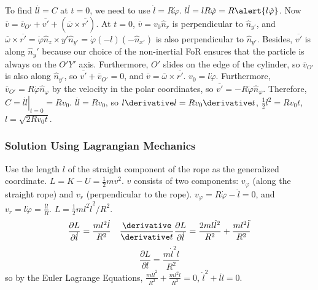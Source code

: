 \begin{frame}
To find $l\dot l=C$ \alert{at $t=0$}, we need to use $\dot l=R\dot\varphi$. $l\dot l=lR\dot\varphi=R\alert{l\dot\varphi}$. Now $\overline{v}=\overline{v}_{O'}+\overline{v'}+(\overline{\omega}\times\overline{r'})$. At $t=0$, $\overline{v}=v_0\hat n_{r}$ is perpendicular to $\hat n_{y'}$, and $\overline{\omega}\times\overline{r'}=\dot\varphi\hat n_z\times y'\hat n_{y'}=\dot\varphi (-l)(-\hat n_{x'})$ is also perpendicular to $\hat n_{y'}$. Besides, $\overline{v'}$ is along $\hat n_y'$ because our choice of the non-inertial FoR ensures that the particle is always on the $O'Y'$ axis. Furthermore, $O'$ slides on the edge of the cylinder, so $\overline{v}_{O'}$ is also along $\hat n_{y'}$, so $\overline{v'}+\overline{v}_{O'}=0$, and $\overline{v}=\overline{\omega}\times\overline{r'}$. \alert{$v_0=l\dot\varphi$}. Furthermore, $\overline{v}_{O'}=R\dot\varphi\hat{n}_{\varphi}$ by the velocity in the polar coordinates, so $\overline{v'}=-R\dot\varphi\hat n_{\varphi}$. Therefore, $C=\left.l\dot l\right|_{t=0}=Rv_0$. $l\dot l=Rv_0$, so $l\derivative l=Rv_0\derivative t$, $\frac{1}{2}l^2=Rv_0 t$, $l=\sqrt{2Rv_0 t}$.
\end{frame}
\begin{frame}
\frametitle{Solution Using Lagrangian Mechanics}Use the length $l$ of the straight component of the rope as the generalized coordinate. $L=K-U=\frac{1}{2}mv^2$. $v$ consists of two components: $v_\varphi$ (along the straight rope) and $v_r$ (perpendicular to the rope). $v_\varphi=R\dot\varphi-\dot l=0$, and $v_r=l\dot\varphi=\frac{l\dot l}{R}$. $L=\frac{1}{2}ml^2\dot{l}^2/R^2$.
\[\frac{\partial L}{\partial \dot{l}}=\frac{ml^2\dot l}{R^2}\quad \frac{\derivative}{\derivative t}\frac{\partial L}{\partial \dot{l}}=\frac{2ml\dot{l}^2}{R^2}+\frac{ml^2\ddot l}{R^2}\]
\[\frac{\partial L}{\partial l}=\frac{m\dot{l}^2l}{R^2}\]
so by the \alert{Euler Lagrange Equations}, $\frac{ml\dot{l}^2}{R^2}+\frac{ml^2\ddot l}{R^2}=0$, $\dot{l}^2+l\ddot{l}=0$.
\end{frame}
